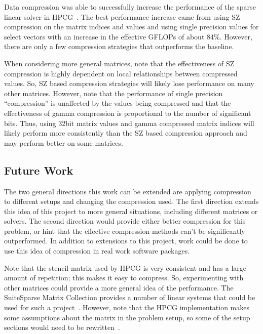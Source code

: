 
Data compression was able to successfully increase the performance of the sparse linear solver in HPCG~\cite{Dongarra:2015:HPCG}.
The best performance increase came from using SZ compression on the matrix indices and values and using single precision values for select vectors with an increase in the effective GFLOPs of about 84\%.
However, there are only a few compression strategies that outperforms the baseline.

When considering more general matrices, note that the effectiveness of SZ compression is highly dependent on local relationships between compressed values.
So, SZ based compression strategies will likely lose performance on many other matrices.
However, note that the performance of single precision ``compression'' is unaffected by the values being compressed and that the effectiveness of gamma compression is proportional to the number of significant bits.
Thus, using 32bit matrix values and gamma compressed matrix indices will likely perform more consistently than the SZ based compression approach and may perform better on some matrices.

\subsection{Future Work}
The two general directions this work can be extended are applying compression to different setups and changing the compression used.
The first direction extends this idea of this project to more general situations, including different matrices or solvers.
The second direction would provide either better compression for this problem, or hint that the effective compression methods can't be significantly outperformed.
In addition to extensions to this project, work could be done to use this idea of compression in real work software packages.

Note that the stencil matrix used by HPCG is very consistent and has a large amount of repetition; this makes it easy to compress.
So, experimenting with other matrices could provide a more general idea of the performance.
The SuiteSparse Matrix Collection provides a number of linear systems that could be used for such a project~\cite{Davis:2011:FloridaMatrixCollection}.
However, note that the HPCG implementation makes some assumptions about the matrix in the problem setup, so some of the setup sections would need to be rewritten~\cite{Dongarra:2015:HPCG}.

